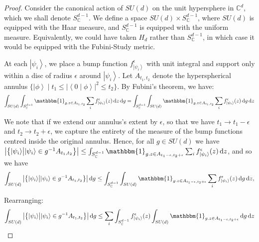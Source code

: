 \documentclass{amsart}
\theoremstyle{definition}
\newcommand{\ket}[1]{{\left\vert{#1}\right\rangle}}
\newcommand{\sprod}[2]{\left|\left< {#1} \middle| {#2} \right>\right|}
\newcommand*\dif{\mathop{}\!\mathrm{d}}
\begin{document}
\begin{proof}
Consider the canonical action of $SU(d)$ on the unit hypersphere in $\mathbb{C}^d$, which we shall denote $S_\mathbb{C}^{d-1}$. We define a space $SU(d)\times S_\mathbb{C}^{d-1}$, where $SU(d)$ is equipped with the Haar measure, and $S_\mathbb{C}^{d-1}$ is equipped with the uniform measure. Equivalently, we could have taken $H_d$ rather than $S_\mathbb{C}^{d-1}$, in which case it would be equipped with the Fubini-Study metric.

At each $\ket{\psi_i}$, we place a bump function $f^\epsilon_\ket{\psi_i}$ with unit integral and support only within a disc of radius $\epsilon$ around $\ket{\psi_i}$.
Let $A_{t_1,t_2}$ denote the hyperspherical annulus $\{\ket{\phi}\mid t_1\leq\sprod{0}{\phi}^2\leq t_2\}$. By Fubini's theorem, we have:
\begin{equation}
\int_{SU(d)} \int_{S_\mathbb{C}^{d-1}} \mathbbm{1}_{g.z\in A_{t_1,t_2}} \sum_i f^\epsilon_\ket{\psi_i}(z) \dif z \dif g = \int_{S_\mathbb{C}^{d-1}} \int_{SU(d)}  \mathbbm{1}_{g.z\in A_{t_1,t_2}} \sum_i f^\epsilon_\ket{\psi_i}(z) \dif g \dif z
\end{equation}




We note that if we extend our annulus's extent by $\epsilon$, so that we have $t_1\rightarrow t_1-\epsilon$ and $t_2\rightarrow t_2+\epsilon$, we capture the entirety of the measure of the bump functions centred inside the original annulus. Hence, for all $g\in SU(d)$ we have $\left|\left\{\ket{\psi_i} \middle| \ket{\psi_i} \in g^{-1}A_{t_1,t_2}\right\}\right|\leq \int_{S_\mathbb{C}^{d-1}} \mathbbm{1}_{g.z\in A_{t_1-\epsilon,t_2+\epsilon}} \sum_i f^\epsilon_\ket{\psi_i}(z) \dif z $, and so we have
\begin{equation}
\int_{SU(d)} \left|\left\{\ket{\psi_i} \middle| \ket{\psi_i} \in g^{-1}A_{t_1,t_2}\right\}\right| \dif g \leq \int_{S_\mathbb{C}^{d-1}} \int_{SU(d)}  \mathbbm{1}_{g.z\in A_{t_1-\epsilon,t_2+\epsilon}} \sum_i f^\epsilon_\ket{\psi_i}(z) \dif g \dif z,
\end{equation}

Rearranging:
\begin{equation}
\int_{SU(d)} \left|\left\{\ket{\psi_i} \middle| \ket{\psi_i} \in g^{-1}A_{t_1,t_2}\right\}\right| \dif g \leq \sum_i\int_{S_\mathbb{C}^{d-1}}f^\epsilon_\ket{\psi_i}(z)  \int_{SU(d)} \mathbbm{1}_{g.z\in A_{t_1-\epsilon,t_2+\epsilon}} \dif g \dif z \label{eqn:1} 
\end{equation}


\end{proof}
\end{document}
